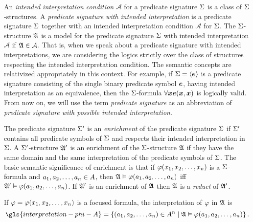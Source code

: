 An \emph{intended interpretation condition} $\mathcal{A}$ for a predicate
signature $\mathrm{\Sigma}$ is a class of $\mathrm{\Sigma}$-structures.
A \emph{predicate signature with intended interpretation} is a predicate
signature $\mathrm{\Sigma}$ together with an intended interpretation condition
$\mathcal{A}$ for $\mathrm{\Sigma}$.
The $\mathrm{\Sigma}$-structure $\mathfrak{A}$ is a model for the predicate signature $\mathrm{\Sigma}$
with intended interpretation $\mathcal{A}$ if $\mathfrak{A}\in\mathcal{A}$.
That is, when we speak about a predicate signature with intended
interpretations, we are considering the logics strictly over the class of
structures respecting the intended interpretation condition.
The semantic concepts are relativized appropriately in this context.
For example, if $\mathrm{\Sigma} = \left\langle \bm{e} \right\rangle$ is a
predicate signature consisting of the single binary predicate symbol $\bm{e}$,
having intended interpretation as an equivalence, then the $\mathrm{\Sigma}$-formula
$\forall\bm{x} \bm{e}(\bm{x},\bm{x})$ is logically valid.
From now on, we will use the term \emph{predicate signature} as an abbreviation
of \emph{predicate signature with possible intended interpretation}.

The predicate signature $\mathrm{\Sigma'}$ is an \emph{enrichment} of the predicate
signature $\mathrm{\Sigma}$ if $\mathrm{\Sigma'}$ contains all predicate symbols of $\mathrm{\Sigma}$ and
respects their intended interpretation in $\mathrm{\Sigma}$. A $\mathrm{\Sigma'}$-structure $\mathfrak{A'}$
is an enrichment of the $\mathrm{\Sigma}$-structure $\mathfrak{A}$ if they have the same domain
and the same interpretation of the predicate symbols of $\mathrm{\Sigma}$.
The basic semantic significance of enrichment is that if
$\varphi(x_{1}, x_{2}, \dots, x_{n})$ is a $\mathrm{\Sigma}$-formula and $a_{1}, a_{2},
\dots, a_{n} \in A$, then $\mathfrak{A} \vDash \varphi(a_{1}, a_{2}, \dots, a_{n})$
iff $\mathfrak{A'} \vDash \varphi(a_{1}, a_{2}, \dots, a_{n})$.
If $\mathfrak{A'}$ is an enrichment of $\mathfrak{A}$ then $\mathfrak{A}$ is a
\emph{reduct}
of $\mathfrak{A'}$.

If $\varphi=\varphi(x_{1}, x_{2}, \dots, x_{n})$ is a focused formula, the
interpretation of $\varphi$ in $\mathfrak{A}$ is
\[
  \gls{interpretation-phi-A} = \setbd{(\eaa1, \eaa2, \dots, \eaa\nn) \in
  \domA^\nn}{\StrA \vDash \fphi(\eaa1, \eaa2, \dots, \eaa\nn)}.
\]
